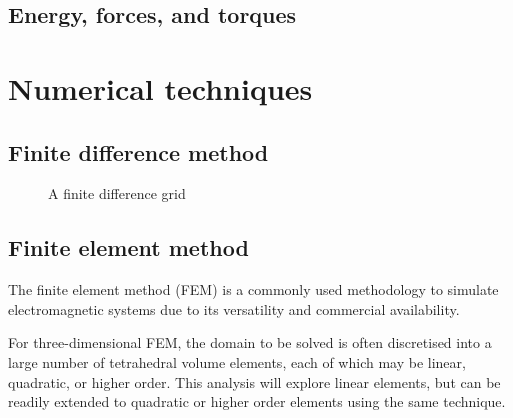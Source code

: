\subsection{Energy, forces, and torques}

\section{Numerical techniques}

\subsection{Finite difference method}

\begin{figure}
    \centering
    \vspace{5cm}
    \caption{A finite difference grid}
    \label{fig:FDMgrid}
\end{figure}

\subsection{Finite element method}
The finite element method (FEM) is a commonly used methodology to simulate electromagnetic systems due to its versatility and commercial availability.

For three-dimensional FEM, the domain to be solved is often discretised into a large number of tetrahedral volume elements, each of which may be linear, quadratic, or higher order. This analysis will explore linear elements, but can be readily extended to quadratic or higher order elements using the same technique.

